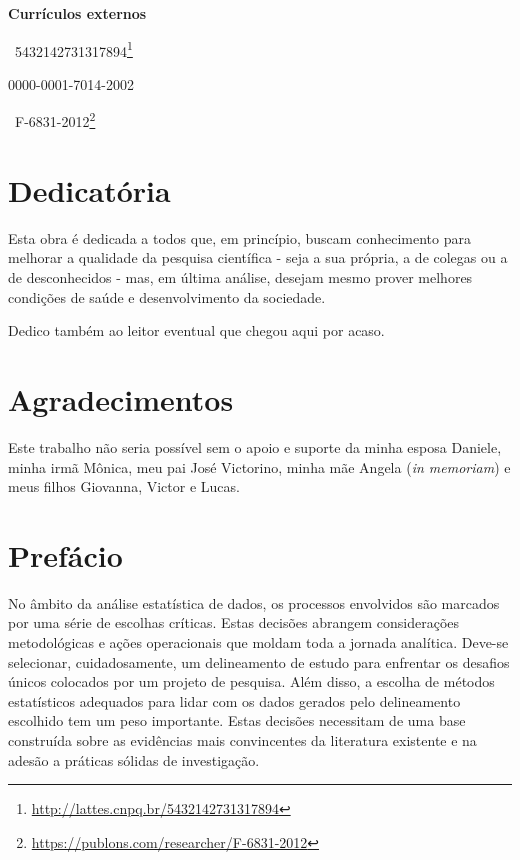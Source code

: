 \documentclass[
  a4paper,
]{book}
\renewcommand{\href}[2]{#2\footnote{\url{#1}}}
\begin{document}
\textbf{Currículos externos}

\href{http://lattes.cnpq.br/5432142731317894}{~5432142731317894}

0000-0001-7014-2002

\href{https://publons.com/researcher/F-6831-2012}{~F-6831-2012}

\hypertarget{dedicatuxf3ria}{%
\chapter*{Dedicatória}\label{dedicatuxf3ria}}

\markboth{}{}

Esta obra é dedicada a todos que, em princípio, buscam conhecimento para melhorar a qualidade da pesquisa científica - seja a sua própria, a de colegas ou a de desconhecidos - mas, em última análise, desejam mesmo prover melhores condições de saúde e desenvolvimento da sociedade.

Dedico também ao leitor eventual que chegou aqui por acaso.

\hypertarget{agradecimentos}{%
\chapter*{Agradecimentos}\label{agradecimentos}}

\markboth{}{}

Este trabalho não seria possível sem o apoio e suporte da minha esposa Daniele, minha irmã Mônica, meu pai José Victorino, minha mãe Angela (\emph{in memoriam}) e meus filhos Giovanna, Victor e Lucas.

\hypertarget{prefuxe1cio}{%
\chapter*{Prefácio}\label{prefuxe1cio}}

\markboth{}{}

No âmbito da análise estatística de dados, os processos envolvidos são marcados por uma série de escolhas críticas. Estas decisões abrangem considerações metodológicas e ações operacionais que moldam toda a jornada analítica. Deve-se selecionar, cuidadosamente, um delineamento de estudo para enfrentar os desafios únicos colocados por um projeto de pesquisa. Além disso, a escolha de métodos estatísticos adequados para lidar com os dados gerados pelo delineamento escolhido tem um peso importante. Estas decisões necessitam de uma base construída sobre as evidências mais convincentes da literatura existente e na adesão a práticas sólidas de investigação.
\end{document}
